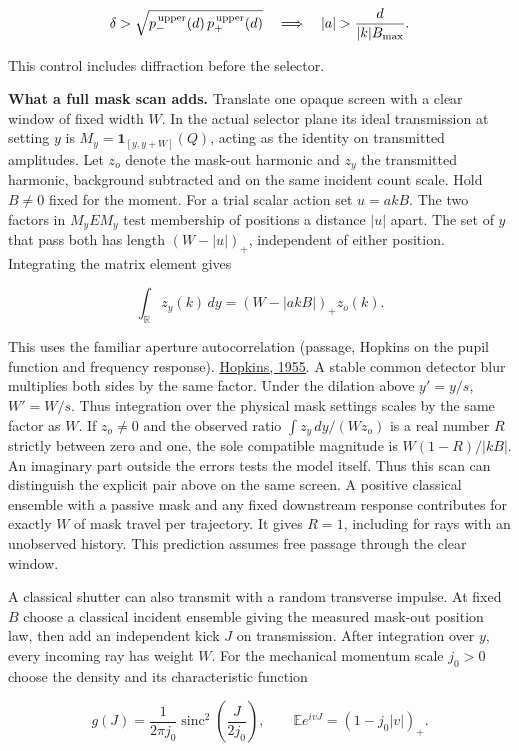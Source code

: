 \documentclass[11pt,a4paper]{article}
\begin{document}
\[
 \delta>\sqrt{p_-^{\,\rm upper}(d)\,p_+^{\,\rm upper}(d)}
 \quad\Longrightarrow\quad |a|>\frac{d}{|k|B_{\max}} .
\]

This control includes diffraction before the selector.

\textbf{What a full mask scan adds.} Translate one opaque screen with a
clear window of fixed width \(W\). In the actual selector plane its
ideal transmission at setting \(y\) is \(M_y=\mathbf{1}_{[y,y+W]}(Q)\),
acting as the identity on transmitted amplitudes. Let \(z_o\) denote the
mask-out harmonic and \(z_y\) the transmitted harmonic, background
subtracted and on the same incident count scale. Hold \(B\ne0\) fixed
for the moment. For a trial scalar action set \(u=akB\). The two factors
in \(M_y E M_y\) test membership of positions a distance \(|u|\) apart.
The set of \(y\) that pass both has length \((W-|u|)_+\), independent of
either position. Integrating the matrix element gives

\[
 \int_{\mathbb R} z_y(k)\,dy=(W-|akB|)_+ z_o(k).
\]

This uses the familiar aperture autocorrelation (passage, Hopkins on the
pupil function and frequency response).
\href{https://janrik.net/Papers/Hopkins-TheFrequencyResponseOfADefocusedOpticalSystem-withNotes.pdf}{Hopkins,
1955}. A stable common detector blur multiplies both sides by the same
factor. Under the dilation above \(y'=y/s\), \(W'=W/s\). Thus
integration over the physical mask settings scales by the same factor as
\(W\). If \(z_o\ne0\) and the observed ratio \(\int z_y\,dy/(Wz_o)\) is
a real number \(R\) strictly between zero and one, the sole compatible
magnitude is \(W(1-R)/|kB|\). An imaginary part outside the errors tests
the model itself. Thus this scan can distinguish the explicit pair above
on the same screen. A positive classical ensemble with a passive mask
and any fixed downstream response contributes for exactly \(W\) of mask
travel per trajectory. It gives \(R=1\), including for rays with an
unobserved history. This prediction assumes free passage through the
clear window.

A classical shutter can also transmit with a random transverse impulse.
At fixed \(B\) choose a classical incident ensemble giving the measured
mask-out position law, then add an independent kick \(J\) on
transmission. After integration over \(y\), every incoming ray has
weight \(W\). For the mechanical momentum scale \(j_0>0\) choose the
density and its characteristic function

\[
 g(J)=\frac{1}{2\pi j_0}\operatorname{sinc}^2\!
          \left(\frac{J}{2j_0}\right),\qquad
 \mathbb E e^{ivJ}=(1-j_0|v|)_+ .
\]
\end{document}
